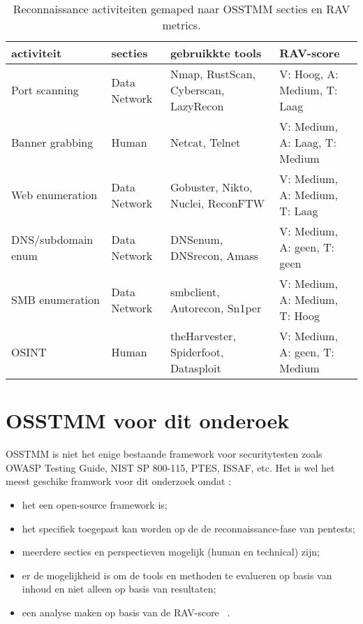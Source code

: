 \begin{table}[H]
  \centering
  \footnotesize
  \begin{tabularx}{\linewidth}{l l X l}
    \toprule
    \textbf{activiteit} & \textbf{secties} & \textbf{gebruikkte tools} & \textbf{RAV-score} \\
    \midrule
    Port scanning       & Data Network & Nmap, RustScan, Cyberscan, LazyRecon & V: Hoog,   A: Medium, T: Laag \\
    Banner grabbing     & Human        & Netcat, Telnet                       & V: Medium, A: Laag,   T: Medium \\
    Web enumeration     & Data Network & Gobuster, Nikto, Nuclei, ReconFTW    & V: Medium, A: Medium, T: Laag \\
    DNS/subdomain enum  & Data Network & DNSenum, DNSrecon, Amass             & V: Medium, A: geen,   T: geen \\
    SMB enumeration     & Data Network & smbclient, Autorecon, Sn1per         & V: Medium, A: Medium, T: Hoog \\
    OSINT               & Human        & theHarvester, Spiderfoot, Datasploit & V: Medium, A: geen,   T: Medium \\
    \bottomrule
  \end{tabularx}
  \caption[Activiteiten in OSSTMM]{\label{tab:recon}Reconnaissance activiteiten gemaped naar OSSTMM secties en RAV metrics.}
\end{table}

\newpage
\section{OSSTMM voor dit onderoek}

OSSTMM is niet het enige bestaande framework voor securitytesten zoals OWASP Testing Guide, NIST SP 800-115, PTES, ISSAF, etc.
Het is wel het meest geschike framwork voor dit onderzoek omdat :

\begin{itemize}
  \item het een open-source framework is;
  \item het specifiek toegepast kan worden op de de reconnaissance-fase van pentests;
  \item meerdere secties en perspectieven mogelijk (human en technical) zijn;
  \item er de mogelijkheid is om de tools en methoden te evalueren op basis van inhoud en niet alleen op basis van resultaten;
  \item een analyse maken op basis van de RAV-score ~\autocite{Herzog}.
\end{itemize}


